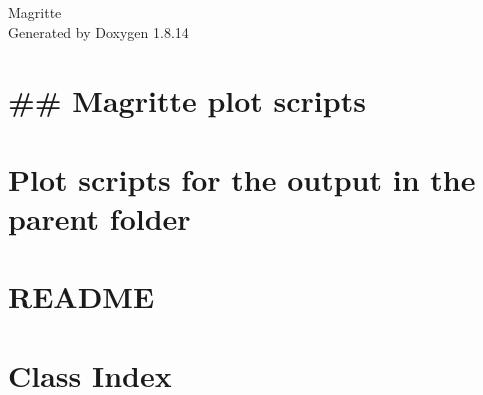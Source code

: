 \documentclass[twoside]{book}
\newcommand{\+}{\discretionary{\mbox{\scriptsize$\hookleftarrow$}}{}{}}
\newcommand{\clearemptydoublepage}{%
  \newpage{\pagestyle{empty}\cleardoublepage}%
}
\begin{document}
\hypersetup{pageanchor=false,
             bookmarksnumbered=true,
             pdfencoding=unicode
            }
\begin{titlepage}
\vspace*{7cm}
\begin{center}%
{\Large Magritte }\\
\vspace*{1cm}
{\large Generated by Doxygen 1.8.14}\\
\end{center}
\end{titlepage}
\clearemptydoublepage
{}
\tableofcontents
\clearemptydoublepage
{}
\hypersetup{pageanchor=true}

\chapter{\#\# Magritte plot scripts}
\label{md__home_frederik_Dropbox_Astro_Magritte_output_plot_scripts_README}

\chapter{Plot scripts for the output in the parent folder}
\label{md__home_frederik_Dropbox_Astro_Magritte_output_README}

\chapter{R\+E\+A\+D\+ME}
\label{md__home_frederik_Dropbox_Astro_Magritte_README}

\chapter{Class Index}

\end{document}
